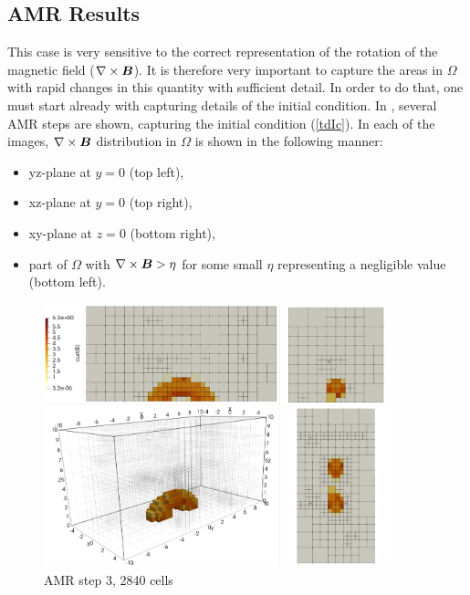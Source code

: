 \subsection{AMR Results}
This case is very sensitive to the correct representation of the rotation of the magnetic field ($\nabla \times \mbox{\boldmath $B$}$). It is therefore very important to capture the areas in $\Omega$ with rapid changes in this quantity with sufficient detail.
In order to do that, one must start already with capturing details of the initial condition.
In , several AMR steps are shown, capturing the initial condition (\cref{tdIc}). In each of the images, $\nabla\times\mbox{\boldmath $B$}$ distribution in $\Omega$ is shown in the following manner:
\begin{itemize}
\item yz-plane at $y = 0$ (top left),
\item xz-plane at $y=0$ (top right),
\item xy-plane at $z=0$ (bottom right),
\item part of $\Omega$ with $\nabla\times\mbox{\boldmath $B$} > \eta$ for some small $\eta$ representing a negligible value (bottom left).
\end{itemize}

\begin{figure}[H]
	\centering
	\includegraphics[width=0.9\textwidth]{img/td/td1.jpg}
\vspace{-2mm}
\caption{AMR step 3, 2840 cells}
\label{figure:myTd1}
\end{figure}
\vspace{-2mm}

